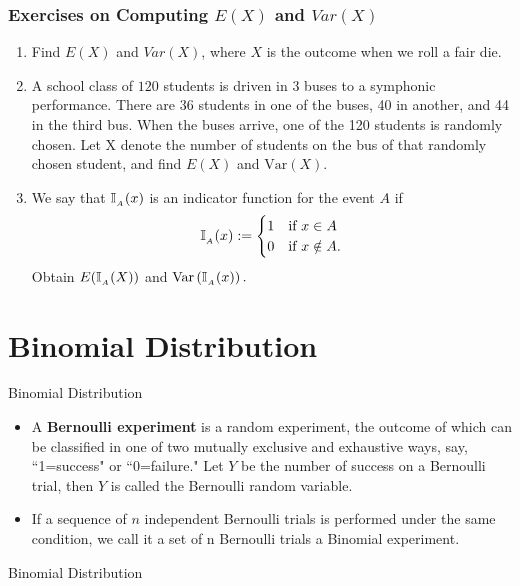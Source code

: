 \documentclass[compress]{beamer}
\begin{document}
\begin{frame}\frametitle{Exercises on Computing $E(X)$ and $Var(X)$}
\begin{enumerate}
\item Find $E(X)$ and $Var(X)$, where $X$ is the outcome when we roll a fair die.
\item A school class of $120$ students is driven in $3$ buses to a symphonic performance. There are 36 students in one of the buses, 40 in another, and 44 in the third bus. When the buses arrive, one of the 120 students is randomly chosen. Let X denote the number of
students on the bus of that randomly chosen student, and find $E(X)$ and $ \text{Var}(X)$.
\item We say that $\mathbb{I}_{_{A}}({x })$ is an indicator function for the event $A$ if 
$$  \mathbb{I}_{_{A}}({x }):=
 \begin{cases}
 1 & \text{if } x\in A\\
  0 & \text{if } x\notin A.
\end{cases}  $$
Obtain $E(  \mathbb{I}_{_{A}}({X }))$ and $ \text{Var}\left( \mathbb{I}_{_{A}}({x }) \right).$
\end{enumerate}

\end{frame}





\section{Binomial Distribution  }


\begin{frame}{Binomial Distribution}
\begin{itemize}
\item A {\bf Bernoulli experiment} is a random experiment, the outcome of which can be classified in one of two mutually exclusive and
exhaustive ways, say,  ``1=success" or ``0=failure." Let $ Y$ be the
number of success on a Bernoulli trial, then $Y$ is called the Bernoulli
random variable. 

\item If a sequence of $n$ independent Bernoulli trials is performed under the same condition, we call it a set of n Bernoulli trials a Binomial experiment.
\end{itemize}
\end{frame}




\begin{frame}{Binomial Distribution}
\end{frame}
\end{document}
